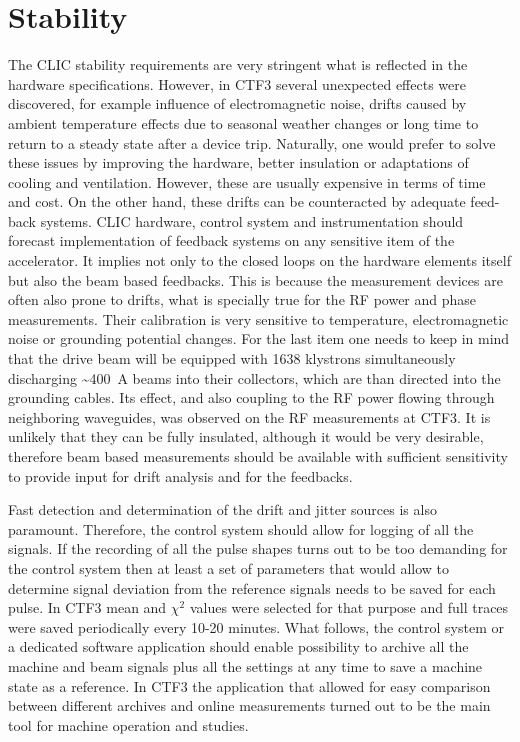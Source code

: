 \section{Stability} 
\label{sec.Stability}

The CLIC stability requirements are very stringent what is reflected 
in the hardware specifications. However, in CTF3 several unexpected
effects were discovered, for example influence of electromagnetic noise, 
drifts caused by ambient temperature effects due to seasonal weather changes
or long time to return to a steady state after a device trip. 
Naturally, one would prefer to solve these 
issues by improving the hardware, better insulation or 
adaptations of cooling and ventilation. However, these are usually 
expensive in terms of time and cost. On the other hand, these drifts can be
counteracted by adequate feed-back systems. CLIC hardware, control system and 
instrumentation should forecast implementation of feedback systems on any
sensitive item of the accelerator. It implies not only to the closed loops on
the hardware elements itself but also the beam based feedbacks. 
This is because the measurement devices are often also prone to drifts, 
what is specially true for the RF power and phase measurements.
Their calibration is very sensitive to temperature, electromagnetic noise 
or grounding potential changes. For the last item one needs to keep in mind
that the drive beam will be equipped with 1638 klystrons simultaneously
discharging \textasciitilde 400~A beams into their collectors, which are than directed
into the grounding cables. Its effect, and also coupling to the RF power flowing 
through neighboring waveguides, was observed on the RF measurements at CTF3.
It is unlikely that they can be fully insulated, although it would be very desirable,
therefore beam based measurements should be available with sufficient sensitivity
to provide input for drift analysis and for the feedbacks. 

Fast detection and determination of the drift and jitter sources is also paramount.
Therefore, the control system should allow for logging of all the signals.
If the recording of all the pulse shapes turns out to be too demanding for the control system then
at least a set of parameters that would allow to determine signal deviation from the reference signals 
needs to be saved for each pulse. 
In CTF3 mean and $\chi^2$ values were selected for that purpose and full traces were saved periodically every 10-20 minutes.
What follows, the control system or a dedicated software application should enable possibility 
to archive all the machine and beam signals plus all the settings at any time to save a machine state as a reference.
In CTF3 the application that allowed for easy comparison between different archives and online measurements 
turned out to be the main tool for machine operation and studies.

